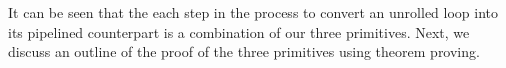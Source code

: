 It can be seen that the each step in the process to convert an unrolled loop into its pipelined counterpart is a combination of our three primitives. Next, we discuss an outline of the proof of the three primitives using theorem proving.


 